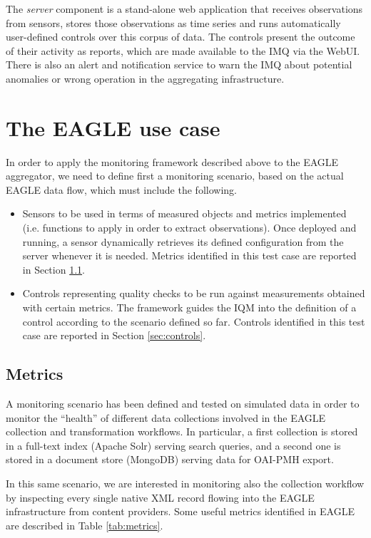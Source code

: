 \documentclass[amsthm,ebook]{saparticle}
\begin{document}
\vspace{5pt}
The \textit{server} component is a stand-alone web application that receives observations from sensors, stores those observations as time series and runs automatically user-defined controls over this corpus of data. The controls present the outcome of their activity as reports, which are made available to the IMQ via the WebUI. There is also an alert and notification service to warn the IMQ about potential anomalies or wrong operation in the aggregating infrastructure.


\section{The EAGLE use case}\label{usecase}

\noindent In order to apply the monitoring framework described above to the EAGLE aggregator, we need to define first a monitoring scenario, based on the actual EAGLE data flow, which must include the following. 
\begin{itemize}
\item Sensors to be used in terms of measured objects and metrics implemented (i.e. functions to apply in order to extract observations). Once deployed and running, a sensor dynamically retrieves its defined configuration from the server whenever it is needed. Metrics identified in this test case are reported in Section \ref{sec:metrics}.
\item Controls representing quality checks to be run against measurements obtained with certain metrics. The framework guides the IQM into the definition of a control according to the scenario defined so far. Controls identified in this test case are reported in Section \ref{sec:controls}.
\end{itemize}


\subsection{Metrics}\label{sec:metrics}

\noindent A monitoring scenario has been defined and tested on simulated data in order to monitor the ``health'' of different data collections involved in the EAGLE collection and transformation workflows. In particular, a first collection is stored in a full-text index (Apache Solr) serving search queries, and a second one is stored in a document store (MongoDB) serving data for OAI-PMH export.

In this same scenario, we are interested in monitoring also the collection workflow by inspecting every single native XML record flowing into the EAGLE infrastructure from content providers. Some useful metrics identified in EAGLE are described in Table \ref{tab:metrics}.
\end{document}

